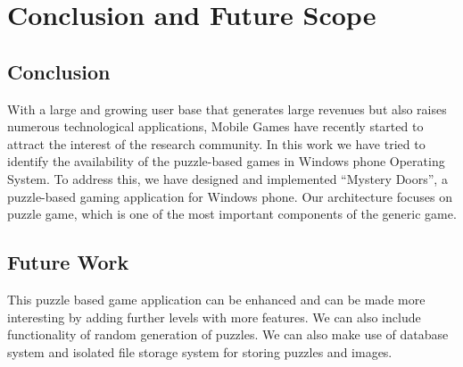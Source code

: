 \chapter{Conclusion and Future Scope}

\section{Conclusion}
With a large and growing user base that generates large revenues but also raises numerous technological applications, Mobile Games have recently started to attract the interest of the research community. In this work we have tried to identify the availability of the puzzle-based games in Windows phone Operating System. To address this, we have designed and implemented “Mystery Doors”, a puzzle-based gaming application for Windows phone. Our architecture focuses on puzzle game, which is one of the most important components of the generic game. \\
\section{Future Work}      
This puzzle based game application can be enhanced and can be made more interesting by adding further levels with more features. We can also include functionality of random generation of puzzles. We can also make use of database system and isolated file storage system for storing puzzles and images.\\
      